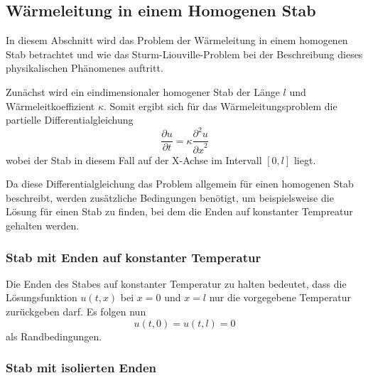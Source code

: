 %
%
%

\subsection{Wärmeleitung in einem Homogenen Stab}

In diesem Abschnitt wird das Problem der Wärmeleitung in einem homogenen Stab
betrachtet und wie das Sturm-Liouville-Problem bei der Beschreibung dieses
physikalischen Phänomenes auftritt.

Zunächst wird ein eindimensionaler homogener Stab der Länge $l$ und
Wärmeleitkoeffizient $\kappa$.
Somit ergibt sich für das Wärmeleitungsproblem
die partielle Differentialgleichung
\begin{equation}
    \label{eq:slp-example-fourier-heat-equation}
    \frac{\partial u}{\partial t} =
    \kappa \frac{\partial^{2}u}{{\partial x}^{2}}
\end{equation}
wobei der Stab in diesem Fall auf der X-Achse im Intervall $[0,l]$ liegt.

Da diese Differentialgleichung das Problem allgemein für einen homogenen
Stab beschreibt, werden zusätzliche Bedingungen benötigt, um beispielsweise
die Lösung für einen Stab zu finden, bei dem die Enden auf konstanter 
Tempreatur gehalten werden.


\subsubsection{Stab mit Enden auf konstanter Temperatur}

Die Enden des Stabes auf konstanter Temperatur zu halten bedeutet, dass die
Lösungsfunktion $u(t,x)$ bei $x = 0$ und $x = l$ nur die vorgegebene
Temperatur zurückgeben darf.
Es folgen nun
\begin{equation}
    \label{eq:slp-example-fourier-boundary-condition-ends-constant}
    u(t,0)
    =
    u(t,l)
    =
    0
\end{equation}
als Randbedingungen.


\subsubsection{Stab mit isolierten Enden}

